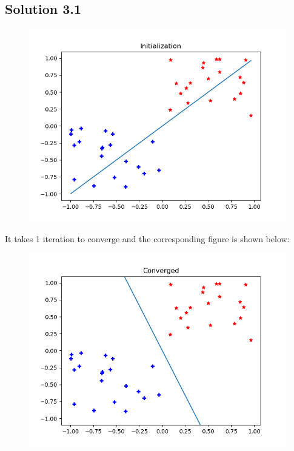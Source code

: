 \subsection*{Solution 3.1}
\begin{figure}[!ht]
	\includegraphics[scale=0.85]{init.png}
\end{figure}
It takes 1 iteration to converge and the corresponding figure is shown below:
\begin{figure}[!ht]
	\includegraphics[scale=0.85]{converged.png}
\end{figure}
\newpage
